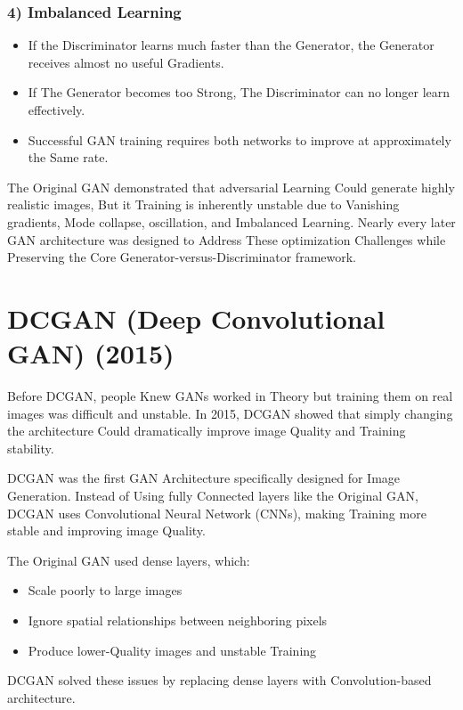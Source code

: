 \subsubsection*{4) Imbalanced Learning}
\begin{itemize}
    \item If the Discriminator learns much faster than the Generator, the Generator receives almost no useful Gradients.
    \item If The Generator becomes too Strong, The Discriminator can no longer learn effectively.
    \item Successful GAN training requires both networks to improve at approximately the Same rate.
\end{itemize}

The Original GAN demonstrated that adversarial Learning Could generate highly realistic images, But it Training is inherently unstable due to Vanishing gradients, Mode collapse, oscillation, and Imbalanced Learning. Nearly every later GAN architecture was designed to Address These optimization Challenges while Preserving the Core Generator-versus-Discriminator framework.

\section{DCGAN (Deep Convolutional GAN) (2015)}

Before DCGAN, people Knew GANs worked in Theory but training them on real images was difficult and unstable.
In 2015, DCGAN showed that simply changing the architecture Could dramatically improve image Quality and Training stability.

DCGAN was the first GAN Architecture specifically designed for Image Generation. Instead of Using fully Connected layers like the Original GAN, DCGAN uses Convolutional Neural Network (CNNs), making Training more stable and improving image Quality.

The Original GAN used dense layers, which:
\begin{itemize}
    \item Scale poorly to large images
    \item Ignore spatial relationships between neighboring pixels
    \item Produce lower-Quality images and unstable Training
\end{itemize}

DCGAN solved these issues by replacing dense layers with Convolution-based architecture.

